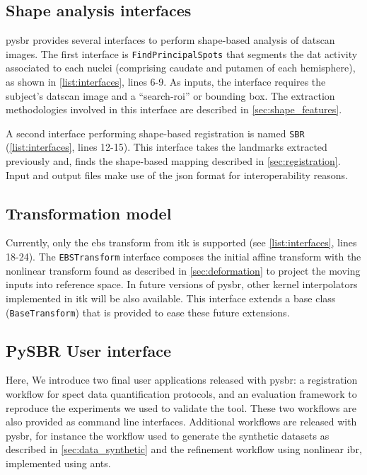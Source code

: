 \documentclass{frontiers}
\begin{document}
\subsection*{Shape analysis interfaces}
\label{supl:shapeanalysis}

\Gls*{pysbr} provides several interfaces to perform shape-based analysis of \gls*{datscan}
  images.
The first interface is \texttt{FindPrincipalSpots} that segments the \acrlong*{dat} activity
  associated to each nuclei (comprising caudate and putamen of each hemisphere),
  as shown in \autoref{list:interfaces}, lines 6-9.
As inputs, the interface requires the subject's \gls*{datscan} image and a ``search-\gls*{roi}'' or
  bounding box.
The extraction methodologies involved in this interface are described in \autoref{sec:shape_features}.

A second interface performing shape-based registration is named \texttt{SBR}
  (\autoref{list:interfaces}, lines 12-15).
This interface takes the landmarks extracted previously and, finds
  the shape-based mapping described in \autoref{sec:registration}.
Input and output files make use of the \gls*{json} format
  for interoperability reasons.

\subsection*{Transformation model} %
Currently, only the \gls*{ebs} transform from \gls*{itk} is supported
  (see \autoref{list:interfaces}, lines 18-24).
The \texttt{EBSTransform} interface composes the initial affine transform
  with the nonlinear transform found as described in \autoref{sec:deformation}
  to project the moving inputs into reference space.
In future versions of \gls*{pysbr}, other kernel interpolators implemented in \gls*{itk} 
  will be also available.
This interface extends a base class (\texttt{BaseTransform}) that is provided to
  ease these future extensions.


\subsection*{PySBR User interface}
\label{supl:user_interface}

Here, We introduce two final user
  applications released with \gls*{pysbr}: a registration workflow for
  \gls*{spect} data quantification protocols, and an evaluation framework
  to reproduce the experiments we used to validate the tool.
These two workflows are also provided as command line interfaces.
Additional workflows are released with \gls*{pysbr}, for instance
  the workflow used to generate the synthetic datasets as described
  in \autoref{sec:data_synthetic} and the refinement workflow using
  nonlinear \gls*{ibr}, implemented using \gls*{ants}.
\end{document}
